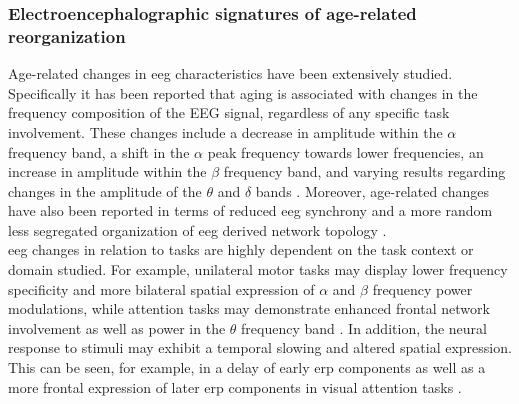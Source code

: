 \subsubsection{Electroencephalographic signatures of age-related reorganization}
Age-related changes in \gls{eeg} characteristics have been extensively studied. Specifically it has been reported that aging is associated with changes in the frequency composition of the EEG signal, regardless of any specific task involvement. These changes include a decrease in amplitude within the $\alpha$ frequency band, a shift in the $\alpha$ peak frequency towards lower frequencies, an increase in amplitude within the $\beta$ frequency band, and varying results regarding changes in the amplitude of the $\theta$ and $\delta$ bands \cite{ROSSINI2007375, Ishii2017, Courtney2021}. Moreover, age-related changes have also been reported in terms of reduced \gls{eeg} synchrony and a more random less segregated organization of \gls{eeg} derived network topology \cite{Smit2012, Samogin2022}.\\
\Gls{eeg} changes in relation to tasks are highly dependent on the task context or domain studied. For example, unilateral motor tasks may display lower frequency specificity and more bilateral spatial expression of $\alpha$ and $\beta$ frequency power modulations, while attention tasks may demonstrate enhanced frontal network involvement as well as power in the $\theta$ frequency band \cite{Hong2016,Quandt2016}. In addition, the neural response to stimuli may exhibit a temporal slowing and altered spatial expression. This can be seen, for example, in a delay of early \gls{erp} components as well as a more frontal expression of later \gls{erp} components in visual attention tasks \cite{LI2013477, Reuter2017}.\\
